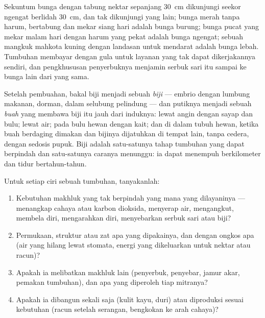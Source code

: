 \begin{example}\label{ex:g12:plant-rooted-life:match}
Sekuntum bunga dengan tabung nektar sepanjang \qty{30}{cm} dikunjungi
seekor ngengat berlidah \qty{30}{cm}, dan tak dikunjungi yang lain;
bunga merah tanpa harum, bertabung dan mekar siang hari adalah bunga
burung; bunga pucat yang mekar malam hari dengan harum yang pekat
adalah bunga ngengat; sebuah mangkuk mahkota kuning dengan landasan
untuk mendarat adalah bunga lebah. Tumbuhan membayar dengan gula untuk
layanan yang tak dapat dikerjakannya sendiri, dan pengkhususan
penyerbuknya menjamin serbuk sari itu sampai ke bunga lain dari 
yang sama.
\end{example}

\begin{proposition}\label{prop:g12:plant-rooted-life:dispersal}
Setelah pembuahan, bakal biji menjadi sebuah \emph{biji} --- embrio
dengan lumbung makanan, dorman, dalam selubung pelindung --- dan
putiknya menjadi sebuah \emph{buah} yang membawa biji itu jauh dari
induknya: lewat angin dengan sayap dan bulu; lewat air; pada bulu hewan
dengan kait; dan di dalam tubuh hewan, ketika buah berdaging dimakan
dan bijinya dijatuhkan di tempat lain, tanpa cedera, dengan sedosis
pupuk. Biji adalah satu-satunya tahap tumbuhan yang dapat berpindah
dan satu-satunya caranya menunggu: ia dapat menempuh berkilometer dan
tidur bertahun-tahun.
\end{proposition}
\admitted

\begin{method}\label{met:g12:plant-rooted-life:read}
Untuk setiap ciri sebuah tumbuhan, tanyakanlah:
\begin{enumerate}
  \item Kebutuhan makhluk yang tak berpindah yang mana yang
        dilayaninya --- menangkap cahaya atau karbon dioksida,
        menyerap air, mengangkut, membela diri, mengarahkan diri,
        menyebarkan serbuk sari atau biji?
  \item Permukaan, struktur atau zat apa yang dipakainya, dan dengan
        ongkos apa (air yang hilang lewat stomata, energi yang
        dikeluarkan untuk nektar atau racun)?
  \item Apakah ia melibatkan makhluk lain (penyerbuk, penyebar, jamur
        akar, pemakan tumbuhan), dan apa yang diperoleh tiap mitranya?
  \item Apakah ia dibangun sekali saja (kulit kayu, duri) atau
        diproduksi sesuai kebutuhan (racun setelah serangan, bengkokan
        ke arah cahaya)?
\end{enumerate}
\end{method}

